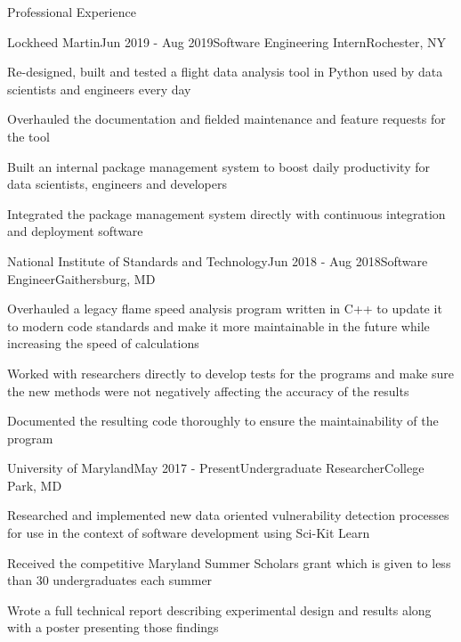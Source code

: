 \documentclass{resume} %
\begin{document}
\begin{rSection}{Professional Experience}


\begin{rSubsection}{Lockheed Martin}{Jun 2019 - Aug 2019}{Software Engineering Intern}{Rochester, NY}
\item Re-designed, built and tested a flight data analysis tool in Python used by data scientists and engineers every day
\item Overhauled the documentation and fielded maintenance and feature requests for the tool
\item Built an internal package management system to boost daily productivity for data scientists, engineers and developers
\item Integrated the package management system directly with continuous integration and deployment software
\end{rSubsection}


\begin{rSubsection}{National Institute of Standards and Technology}{Jun 2018 - Aug 2018}{Software Engineer}{Gaithersburg, MD}
\item Overhauled a legacy flame speed analysis program written in C++ to update it to modern code standards and make it more maintainable in the future while increasing the speed of calculations
\item Worked with researchers directly to develop tests for the programs and make sure the new methods were not negatively affecting the accuracy of the results
\item Documented the resulting code thoroughly to ensure the maintainability of the program
\end{rSubsection}


\begin{rSubsection}{University of Maryland}{May 2017 - Present}{Undergraduate Researcher}{College Park, MD}
\item Researched and implemented new data oriented vulnerability detection processes for use in the context of software development using Sci-Kit Learn
\item Received the competitive Maryland Summer Scholars grant which is given to less than 30 undergraduates each summer
\item Wrote a full technical report describing experimental design and results along with a poster presenting those findings
\end{rSubsection}


\end{rSection}
\end{document}
